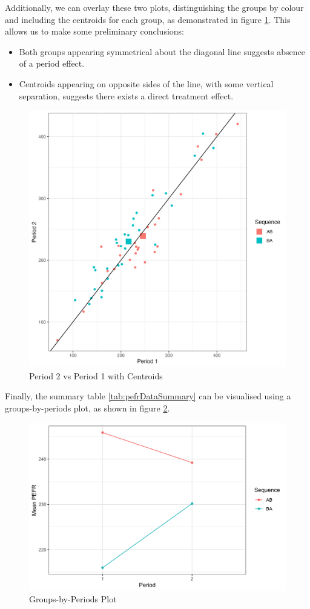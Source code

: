 \documentclass[12pt, TexShade, letterpaper]{report}
\begin{document}
Additionally, we can overlay these two plots, distinguishing the groups by colour and including the centroids for each group, as demonstrated in figure \ref{fig:centroids}. This allows us to make some preliminary conclusions:
\begin{itemize}
    \item Both groups appearing symmetrical about the diagonal line suggests absence of a period effect.
    \item Centroids appearing on opposite sides of the line, with some vertical separation, suggests there exists a direct treatment effect.
\end{itemize}

\begin{figure}[ht]
    \centering
    \includegraphics[width=0.85\linewidth]{report/figures/ch2/centroidsPlot.png}
    \caption{Period 2 vs Period 1 with Centroids}
    \label{fig:centroids}
\end{figure}

Finally, the summary table \ref{tab:pefrDataSummary} can be visualised using a groups-by-periods plot, as shown in figure \ref{fig:groupsbyperiods}.
\begin{figure}[ht]
    \centering
    \includegraphics[width=0.85\linewidth]{report/figures/groupsByPeriodsPlot.png}
    \caption{Groups-by-Periods Plot}
    \label{fig:groupsbyperiods}
\end{figure}
\end{document}
